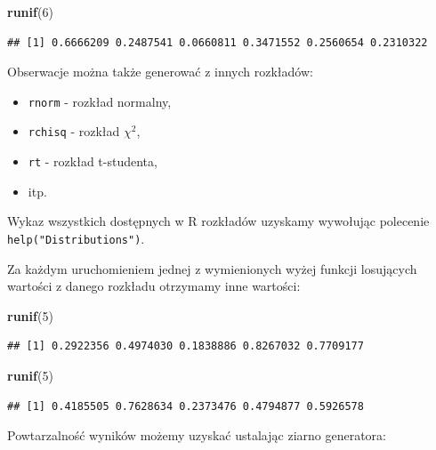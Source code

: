 \documentclass[]{book}
\newenvironment{Shaded}{\begin{snugshade}}{\end{snugshade}}
\newcommand{\KeywordTok}[1]{\textcolor[rgb]{0.13,0.29,0.53}{\textbf{#1}}}
\newcommand{\DecValTok}[1]{\textcolor[rgb]{0.00,0.00,0.81}{#1}}
\newcommand{\NormalTok}[1]{#1}
\providecommand{\tightlist}{%
  \setlength{\itemsep}{0pt}\setlength{\parskip}{0pt}}
\begin{document}
\begin{Shaded}
\begin{Highlighting}[]
\KeywordTok{runif}\NormalTok{(}\DecValTok{6}\NormalTok{)}
\end{Highlighting}
\end{Shaded}

\begin{verbatim}
## [1] 0.6666209 0.2487541 0.0660811 0.3471552 0.2560654 0.2310322
\end{verbatim}

Obserwacje można także generować z innych rozkładów:

\begin{itemize}
\tightlist
\item
  \texttt{rnorm} - rozkład normalny,
\item
  \texttt{rchisq} - rozkład \(\chi^2\),
\item
  \texttt{rt} - rozkład t-studenta,
\item
  itp.
\end{itemize}

Wykaz wszystkich dostępnych w R rozkładów uzyskamy wywołując polecenie
\texttt{help("Distributions")}.

Za każdym uruchomieniem jednej z wymienionych wyżej funkcji losujących
wartości z danego rozkładu otrzymamy inne wartości:

\begin{Shaded}
\begin{Highlighting}[]
\KeywordTok{runif}\NormalTok{(}\DecValTok{5}\NormalTok{)}
\end{Highlighting}
\end{Shaded}

\begin{verbatim}
## [1] 0.2922356 0.4974030 0.1838886 0.8267032 0.7709177
\end{verbatim}

\begin{Shaded}
\begin{Highlighting}[]
\KeywordTok{runif}\NormalTok{(}\DecValTok{5}\NormalTok{)}
\end{Highlighting}
\end{Shaded}

\begin{verbatim}
## [1] 0.4185505 0.7628634 0.2373476 0.4794877 0.5926578
\end{verbatim}

Powtarzalność wyników możemy uzyskać ustalając ziarno generatora:
\end{document}
